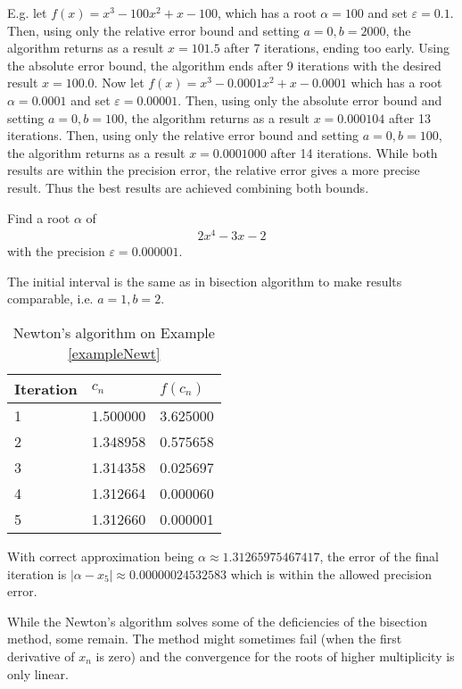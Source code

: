 \documentclass[
  digital, %
  notable,   %
  nolof,     %
  nolot,     %
	final, %
]{fithesis3}
\begin{document}
E.g. let $f(x)=x^3-100x^2+x-100$, which has a root $\alpha=100$ and set $\varepsilon=0.1$. Then, using only the relative error bound and setting $a=0, b=2000$, the algorithm returns as a result $x=101.5$ after 7 iterations, ending too early. Using the absolute error bound, the algorithm ends after 9 iterations with the desired result $x=100.0$. 
Now let $f(x)=x^3-0.0001x^2+x-0.0001$ which has a root $\alpha=0.0001$ and set $\varepsilon=0.00001$. Then, using only the absolute error bound and setting $a=0, b=100$, the algorithm returns as a result $x=0.000104$ after 13 iterations. Then, using only the relative error bound and setting $a=0, b=100$, the algorithm returns as a result $x=0.0001000$ after 14 iterations. While both results are within the precision error, the relative error gives a more precise result. Thus the best results are achieved combining both bounds.
\begin{example}
\label{exampleNewt}
Find a root $\alpha$ of 
\begin{align}
      2x^{4} - 3x - 2
\end{align}
with the precision $\varepsilon = 0.000001$.
\end{example}
The initial interval is the same as in bisection algorithm to make results comparable, i.e. $a=1, b=2$.
\FloatBarrier
\begin{table}[H]
  \begin{tabular*}{\textwidth}{lll}
    \toprule
    Iteration & $c_{n}$ & $f(c_{n})$\\
    \midrule
			1 & 1.500000 & 3.625000 \\
			2 & 1.348958 & 0.575658 \\
			3 & 1.314358 & 0.025697 \\
			4 & 1.312664 & 0.000060 \\
			5 & 1.312660 & 0.000001 \\
    \bottomrule
  \end{tabular*}
  \caption{Newton's algorithm on Example \ref{exampleNewt}}
  \label{tab:newt}
\end{table}

With correct approximation being $\alpha \approx 1.31265975467417$, the error of the final iteration is $|\alpha - x_{5}|\approx0.00000024532583$ which is within the allowed precision error.

While the Newton's algorithm solves some of the deficiencies of the bisection method, some remain. The method might sometimes fail (when the first derivative of $x_{n}$ is zero) and the convergence for the roots of higher multiplicity is only linear.
\end{document}
